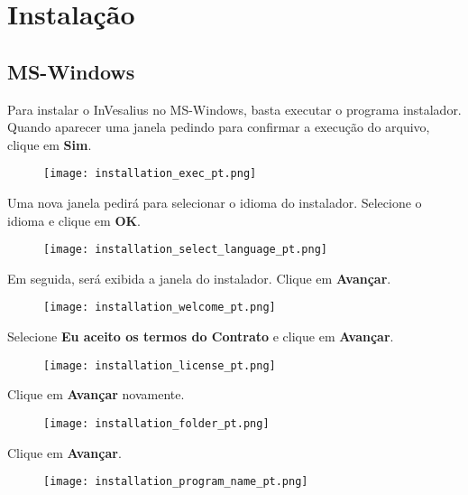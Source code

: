 \chapter{Instalação}

\section{MS-Windows}

Para instalar o InVesalius no MS-Windows, basta executar o programa instalador.
Quando aparecer uma janela pedindo para confirmar a execução do arquivo, clique
em \textbf{Sim}.

\begin{figure}[!htb]
\centering
\texttt{[image: installation\_exec\_pt.png]}
\end{figure}

\newpage
Uma nova janela pedirá para selecionar o idioma do instalador. Selecione
o idioma e clique em \textbf{OK}.

\begin{figure}[!htb]
\centering
\texttt{[image: installation\_select\_language\_pt.png]}
\end{figure}
 
\hspace{.2cm}

Em seguida, será exibida a janela do instalador. Clique em \textbf{Avançar}.

\begin{figure}[!htb]
\centering
\texttt{[image: installation\_welcome\_pt.png]}
\end{figure}

\newpage

Selecione \textbf{Eu aceito os termos do Contrato} e clique em \textbf{Avançar}.

\begin{figure}[!htb] 
\centering
\texttt{[image: installation\_license\_pt.png]}
\end{figure}

\hspace{.2cm}

Clique em \textbf{Avançar} novamente. 

\begin{figure}[!htb]  
\centering
\texttt{[image: installation\_folder\_pt.png]}
\end{figure}

\newpage

Clique em \textbf{Avançar}.
\begin{figure}[!htb]
\centering
\texttt{[image: installation\_program\_name\_pt.png]}
\end{figure}

